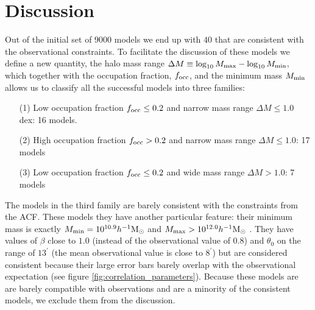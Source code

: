 \documentclass{emulateapj}
\newcommand{\hMsun}{{\ifmmode{h^{-1}{\rm
        {M_{\odot}}}}\else{$h^{-1}{\rm{M_{\odot}}}$}\fi}}
\begin{document}
\section{Discussion}
\label{sec:discussion}




Out of the initial set of $9000$ models we end up with $40$ that are
consistent with the observational constraints. To facilitate the
discussion of these models we define a new quantity, the halo mass
range $\Delta M\equiv \log_{10}M_{\rm max} - \log_{10}M_{\rm  min}$, which
together with the occupation fraction, $f_{\rm occ}$, and the minimum
mass $M_{\rm min}$ allows us to classify all the successful models into
three families:     
  

\begin{itemize}
\item[(1)] Low occupation fraction $f_{\rm occ}\leq 0.2$ and narrow
  mass range $\Delta M\leq 1.0$ 
  dex: 16 models. 
\item[(2)] High occupation fraction $f_{\rm occ}> 0.2$ and
  narrow mass range $\Delta M\leq 1.0$: 17 models 
\item[(3)] Low occupation fraction $f_{\rm occ}\leq 0.2$ 
  and wide mass range $\Delta M>1.0$: 7 models
\end{itemize}



The models in the third family are barely consistent with the
  constraints from the ACF. These models they have another particular
  feature: their minimum mass is exactly $M_{\rm min}=10^{10.9}\hMsun$
  and $M_{\rm max}>10^{12.0}\hMsun$ . They have values of $\beta$
  close to $1.0$ (instead of the observational value of $0.8$) and
  $\theta_0$ on the range of $13^{\prime}$ (the mean observational
  value is close to $8^{\prime}$) but are considered consistent
  because their large error bars barely overlap with the observational
  expectation (see figure \ref{fig:correlation_parameters}).
  Because these models are are barely compatible with observations and
  are a minority of the consistent models, we exclude them from the
  discussion.
\end{document}
